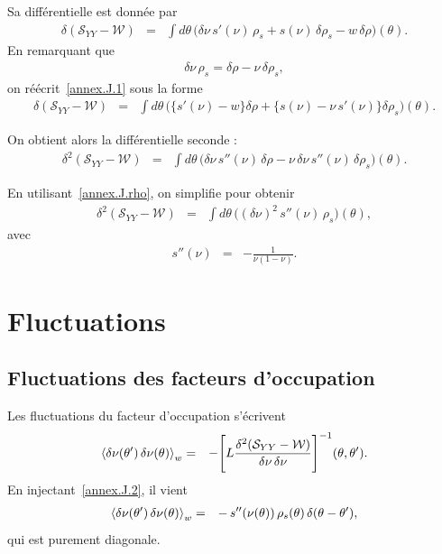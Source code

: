 Sa différentielle est donnée par
\begin{eqnarray}\label{annex.J.1}
	\delta ( \mathcal{S}_{YY} -  \mathcal{W} ) 
	&=& \int d \theta \, \Big( \delta \nu \, s'(\nu)\, \rho_s + s(\nu)\, \delta \rho_s - w\, \delta \rho \Big)(\theta).
\end{eqnarray}
En remarquant que
\begin{eqnarray}\label{annex.J.rho}
	\delta \nu \, \rho_s = \delta \rho - \nu \, \delta \rho_s, 	
\end{eqnarray}
on réécrit~\eqref{annex.J.1} sous la forme
\begin{eqnarray}
	\delta ( \mathcal{S}_{YY} -  \mathcal{W} ) 
	&=& \int d \theta \, \Big( \{  s'(\nu) - w\} \delta \rho  
	+  \{  s(\nu) - \nu \, s'(\nu) \} \delta \rho_s \Big)(\theta). 		
\end{eqnarray}

On obtient alors la différentielle seconde :
\begin{eqnarray}
	\delta^2 ( \mathcal{S}_{YY} -  \mathcal{W} )  
	&=& \int d \theta \, \Big( \delta \nu \, s''(\nu)\, \delta \rho  
	- \nu \, \delta \nu \, s''(\nu)\, \delta \rho_s \Big)(\theta).
\end{eqnarray}

En utilisant~\eqref{annex.J.rho}, on simplifie pour obtenir
\begin{eqnarray}\label{annex.J.2}
	\delta^2 ( \mathcal{S}_{YY} -  \mathcal{W} )  
	&=& \int d \theta \, \big( (\delta \nu )^2 \, s''(\nu)\, \rho_s \big)(\theta),		
\end{eqnarray}
avec
\begin{eqnarray}
	s''(\nu) &=& - \frac{1}{\nu (1 - \nu)}.	
\end{eqnarray}

\section{Fluctuations}

\subsection{Fluctuations des facteurs d’occupation}

Les fluctuations du facteur d’occupation s’écrivent
\begin{eqnarray}
	\braket{\delta\nu(\theta')  \, \delta\nu(\theta)}_w	
	&=& - \Bigg[ L \frac{ \delta^2 ( \mathcal{S}_{YY} -  \mathcal{W} )}{\delta \nu \, \delta \nu } \Bigg]^{-1} ( \theta , \theta' ).
\end{eqnarray}
En injectant~\eqref{annex.J.2}, il vient
\begin{eqnarray}
	\braket{\delta\nu(\theta')  \, \delta\nu(\theta)}_w	
	&=& -\, s''(\nu(\theta)) \, \rho_s(\theta)\, \delta ( \theta - \theta' ),		
\end{eqnarray}
qui est purement diagonale.

